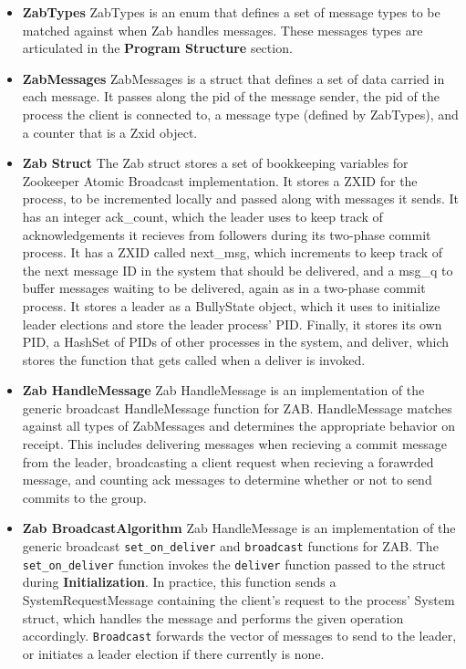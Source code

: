 \documentclass{article}
\begin{document}
	\begin{itemize}
	    \item\textbf{ZabTypes}
	    ZabTypes is an enum that defines a set of message types to be matched against when Zab handles messages. These messages types are articulated in the \textbf{Program Structure} section. 
	    \item\textbf{ZabMessages}
	    ZabMessages is a struct that defines a set of data carried in each message. It passes along the pid of the message sender, the pid of the process the client is connected to, a message type (defined by ZabTypes), and a counter that is a Zxid object. 
	    \item\textbf{Zab Struct}
	    The Zab struct stores a set of bookkeeping variables for Zookeeper Atomic Broadcast implementation. It stores a ZXID for the process, to be incremented locally and passed along with messages it sends. It has an integer ack_count, which the leader uses to keep track of acknowledgements it recieves from followers during its two-phase commit process. It has a ZXID called next_msg, which increments to keep track of the next message ID in the system that should be delivered, and a msg_q to buffer messages waiting to be delivered, again as in a two-phase commit process. It stores a leader as a BullyState object, which it uses to initialize leader elections and store the leader process' PID. Finally, it stores its own PID, a HashSet of PIDs of other processes in the system, and deliver, which stores the function that gets called when a deliver is invoked. 
	    \item\textbf{Zab HandleMessage}
	    Zab HandleMessage is an implementation of the generic broadcast HandleMessage function for ZAB. HandleMessage matches against all types of ZabMessages and determines the appropriate behavior on receipt. This includes delivering messages when recieving a commit message from the leader, broadcasting a client request when recieving a forawrded message, and counting ack messages to determine whether or not to send commits to the group.
   	    \item\textbf{Zab BroadcastAlgorithm}
   	   	Zab HandleMessage is an implementation of the generic broadcast \verb|set_on_deliver| and \verb|broadcast| functions for ZAB. The \verb|set_on_deliver| function invokes the \verb|deliver| function passed to the struct during \textbf{Initialization}. In practice, this function sends a SystemRequestMessage containing the client's request to the process' System struct, which handles the message and performs the given operation accordingly. \verb|Broadcast| forwards the vector of messages to send to the leader, or initiates a leader election if there currently is none. 
	\end{itemize}
\end{document}

